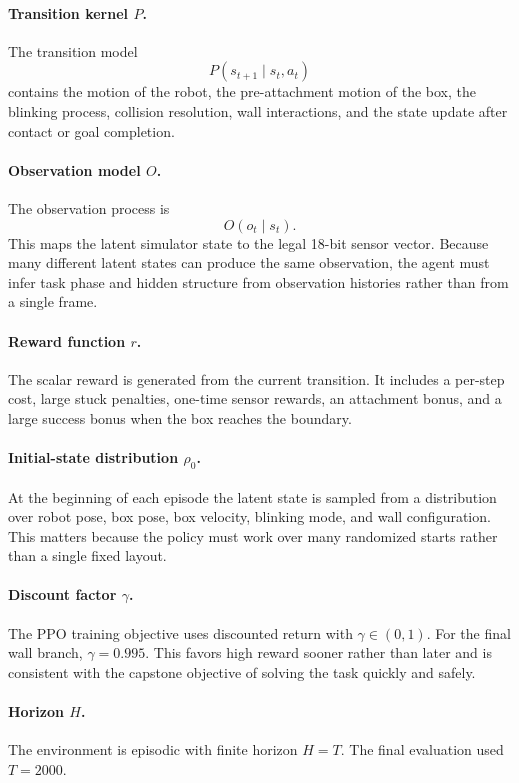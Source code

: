 \documentclass[11pt, oneside]{article}   	%
\begin{document}
\paragraph{Transition kernel \(P\).}
The transition model
\[
  P(s_{t+1}\mid s_t,a_t)
\]
contains the motion of the robot, the pre-attachment motion of the box, the blinking
process, collision resolution, wall interactions, and the state update after contact or
goal completion.

\paragraph{Observation model \(O\).}
The observation process is
\[
  O(o_t\mid s_t).
\]
This maps the latent simulator state to the legal 18-bit sensor vector. Because many
different latent states can produce the same observation, the agent must infer task phase
and hidden structure from observation histories rather than from a single frame.

\paragraph{Reward function \(r\).}
The scalar reward is generated from the current transition. It includes a per-step cost,
large stuck penalties, one-time sensor rewards, an attachment bonus, and a large success
bonus when the box reaches the boundary.

\paragraph{Initial-state distribution \(\rho_0\).}
At the beginning of each episode the latent state is sampled from a distribution over
robot pose, box pose, box velocity, blinking mode, and wall configuration. This matters
because the policy must work over many randomized starts rather than a single fixed
layout.

\paragraph{Discount factor \(\gamma\).}
The PPO training objective uses discounted return with \(\gamma\in(0,1)\). For the final
wall branch, \(\gamma=0.995\). This favors high reward sooner rather than later and is
consistent with the capstone objective of solving the task quickly and safely.

\paragraph{Horizon \(H\).}
The environment is episodic with finite horizon \(H=T\). The final evaluation used
\(T=2000\).
\end{document}
